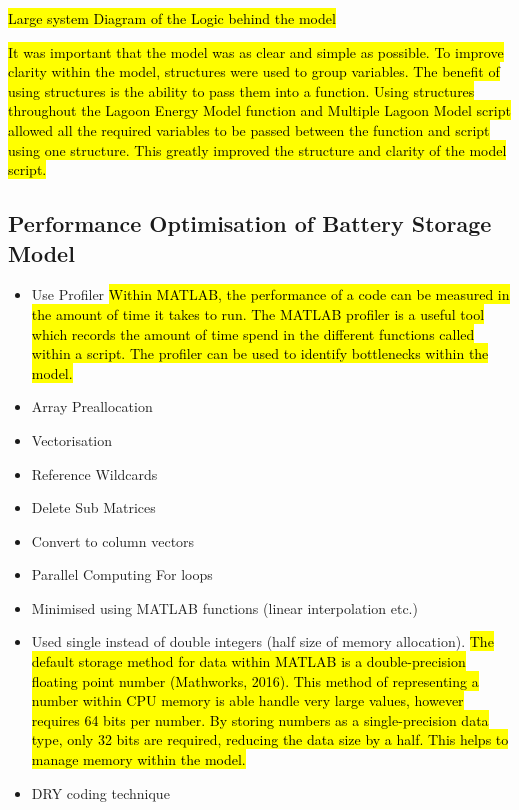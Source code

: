 \hl{Large system Diagram of the Logic behind the model}

\hl{It was important that the model was as clear and simple as possible. To improve clarity within the model, structures were used to group variables. The benefit of using structures is the ability to pass them into a function. Using structures throughout the Lagoon Energy Model function and Multiple Lagoon Model script allowed all the required variables to be passed between the function and script using one structure. This greatly improved the structure and clarity of the model script.}

\subsection{Performance Optimisation of Battery Storage
Model}\label{performance-optimisation-of-battery-storage-model}

\autocite{getreuer5685writing}

\begin{itemize}
\tightlist
\item
  Use Profiler
  \hl{Within MATLAB, the performance of a code can be measured in the amount of time it takes to run. The MATLAB profiler is a useful tool which records the amount of time spend in the different functions called within a script. The profiler can be used to identify bottlenecks within the model.}
\item
  Array Preallocation
\item
  Vectorisation
\item
  Reference Wildcards
\item
  Delete Sub Matrices
\item
  Convert to column vectors
\item
  Parallel Computing For loops
\item
  Minimised using MATLAB functions (linear interpolation etc.)
\item
  Used single instead of double integers (half size of memory
  allocation).
  \hl{The default storage method for data within MATLAB is a double-precision floating point number (Mathworks, 2016). This method of representing a number within CPU memory is able handle very large values, however requires 64 bits per number. By storing numbers as a single-precision data type, only 32 bits are required, reducing the data size by a half. This helps to manage memory within the model.}
\item
  DRY coding technique
\end{itemize}


